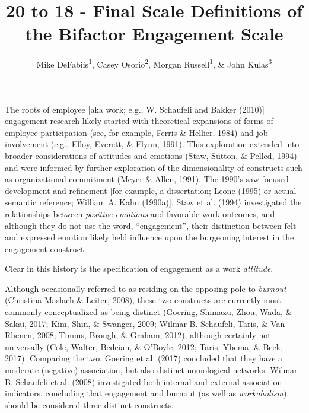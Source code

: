\documentclass[
  man]{apa6}
\title{20 to 18 - Final Scale Definitions of the Bifactor Engagement Scale}
\author{Mike DeFabiis\textsuperscript{1}, Casey Osorio\textsuperscript{2}, Morgan Russell\textsuperscript{1}, \& John Kulas\textsuperscript{3}}
\date{}
\affiliation{\vspace{0.5cm}\textsuperscript{1} Montclair State University\\\textsuperscript{2} Harver\\\textsuperscript{3} eRg}
\begin{document}
\maketitle

The roots of employee {[}aka work; e.g., W. Schaufeli and Bakker (2010){]} engagement research likely started with theoretical expansions of forms of employee participation (see, for example, Ferris \& Hellier, 1984) and job involvement (e.g., Elloy, Everett, \& Flynn, 1991). This exploration extended into broader considerations of attitudes and emotions (Staw, Sutton, \& Pelled, 1994) and were informed by further exploration of the dimensionality of constructs such as organizational commitment (Meyer \& Allen, 1991). The 1990's saw focused development and refinement {[}for example, a dissertation; Leone (1995) or actual semantic reference; William A. Kahn (1990a){]}. Staw et al. (1994) investigated the relationships between \emph{positive emotions} and favorable work outcomes, and although they do not use the word, ``engagement'', their distinction between felt and expressed emotion likely held influence upon the burgeoning interest in the engagement construct.

Clear in this history is the specification of engagement as a work \emph{attitude}.

Although occasionally referred to as residing on the opposing pole to \emph{burnout} (Christina Maslach \& Leiter, 2008), these two constructs are currently most commonly conceptualized as being distinct (Goering, Shimazu, Zhou, Wada, \& Sakai, 2017; Kim, Shin, \& Swanger, 2009; Wilmar B. Schaufeli, Taris, \& Van Rhenen, 2008; Timms, Brough, \& Graham, 2012), although certainly not universally (Cole, Walter, Bedeian, \& O'Boyle, 2012; Taris, Ybema, \& Beek, 2017). Comparing the two, Goering et al. (2017) concluded that they have a moderate (negative) association, but also distinct nomological networks. Wilmar B. Schaufeli et al. (2008) investigated both internal and external association indicators, concluding that engagement and burnout (as well as \emph{workaholism}) should be considered three distinct constructs.
\end{document}
